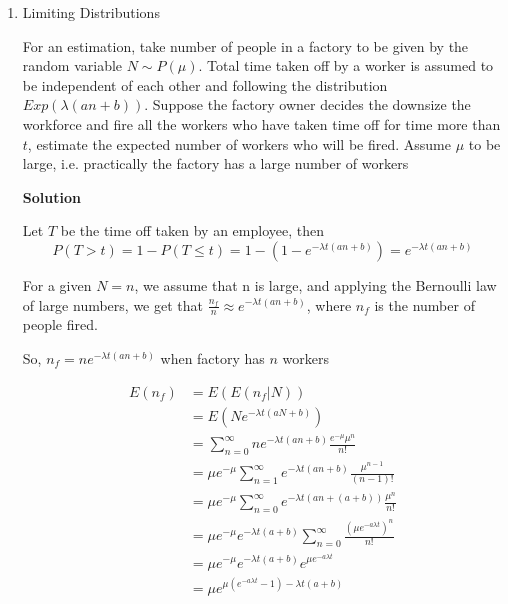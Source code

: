 \documentclass[12pt, oneside]{article}
\begin{document}
\begin{enumerate}
{}

\item {
    Limiting Distributions

    For an estimation, take number of people in a factory to be given by the random variable
    \(N \sim P(\mu)\). Total time taken off by a worker is assumed to be independent of each other
    and following the distribution \(Exp(\lambda (an + b))\). Suppose
    the factory owner decides the downsize the workforce and fire all the workers who have taken
    time off for time more than \(t\), estimate the expected number of workers who will be fired.
    Assume \(\mu\) to be large, i.e. practically the factory has a large number of workers

    \textbf{Solution}

    Let \(T\) be the time off taken by an employee, then
    \[
        P(T > t) = 1 - P(T \leq t) = 1 - (1 - e^{-\lambda t(an + b)}) = e^{-\lambda t(an + b)}
    \]

    For a given \(N = n\), we assume that n is large, and applying the Bernoulli law of
    large numbers, we get that \(\frac{n_f}{n} \approx e^{-\lambda t(an + b)}\), 
    where \(n_f\) is the number of people fired.

    So, \(n_f = n e^{-\lambda t(an + b)}\) when factory has \(n\) workers

    \begin{align*}
        E(n_f) &= E(E(n_f | N)) \\
               &= E(N e^{-\lambda t(aN + b)}) \\
               &= \sum_{n = 0}^{\infty} n e^{-\lambda t(an + b)} \frac{e^{-\mu} \mu^n}{n!} \\
               &= \mu e^{-\mu} \sum_{n = 1}^{\infty} e^{-\lambda t(an + b)} \frac{\mu^{n-1}}{(n-1)!} \\
               &= \mu e^{-\mu} \sum_{n = 0}^{\infty} e^{-\lambda t(an + (a + b))} \frac{\mu^{n}}{n!} \\
               &= \mu e^{-\mu} e^{-\lambda t(a + b)} \sum_{n = 0}^{\infty} \frac{(\mu e^{-a \lambda t})^n}{n!} \\
               &= \mu e^{-\mu} e^{-\lambda t(a + b)} e^{\mu e^{-a \lambda t}} \\
               &= \mu e^{\mu(e^{-a \lambda t} - 1) - \lambda t (a + b)}
    \end{align*}
}



\end{enumerate}
\end{document}
